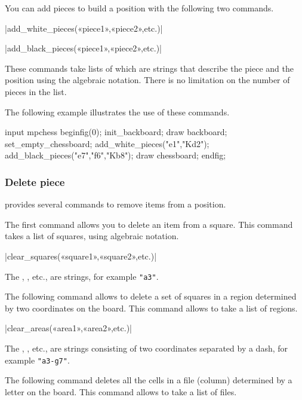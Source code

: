 \documentclass[english]{ltxdoc}
\begin{document}
You can add pieces to build a position with the following two commands.

\commande|add_white_pieces(«piece1»,«piece2»,etc.)|\smallskip


\commande|add_black_pieces(«piece1»,«piece2»,etc.)|\smallskip

These commands take lists of \textbf{} which are strings
that describe the piece and the position using the
algebraic notation. There is no limitation on the number of pieces in the list.

The following example illustrates the use of these commands.

\begin{ExempleMP}
input mpchess
beginfig(0);
init_backboard;
draw backboard;
set_empty_chessboard;
add_white_pieces("e1","Kd2");
add_black_pieces("e7","f6","Kb8");
draw chessboard;
endfig;
\end{ExempleMP}


\subsubsection{Delete piece}

\mpchess provides several commands to remove items from a position.

The first command allows you to delete an item from a square. This command takes
a list of squares, using algebraic notation.

\commande|clear_squares(«square1»,«square2»,etc.)|\smallskip

The \textbf{}, \textbf{}, etc., are strings, for example \lstinline+"a3"+.
\medskip

The following command allows to delete a set of squares in a region
determined by two coordinates on the board. This command allows to take
a list of regions.

\commande|clear_areas(«area1»,«area2»,etc.)|\smallskip

The \textbf{}, \textbf{}, etc., are strings consisting of two coordinates separated by a dash, for example \lstinline+"a3-g7"+.
\medskip

The following command deletes all the cells in a file (column) determined by a
letter on the board. This command allows to take a list of files.
\end{document}
